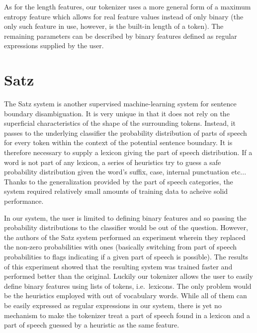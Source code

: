 As for the length features, our tokenizer uses a more general form of a maximum
entropy feature which allows for real feature values instead of only binary
(the only such feature in use, however, is the built-in length of a token).
The remaining parameters can be described by binary features defined as regular
expressions supplied by the user.

\section{Satz}
\label{sec:survey-satz}

The Satz system is another supervised machine-learning system for sentence
boundary disambiguation. It is very unique in that it does not rely on the
superficial characteristics of the shape of the surrounding tokens. Instead, it
passes to the underlying classifier the probability distribution of parts of
speech for every token within the context of the potential sentence boundary.
It is therefore necessary to supply a lexicon giving the part of speech
distribution. If a word is not part of any lexicon, a series of heuristics try
to guess a safe probability distribution given the word's suffix, case,
internal punctuation etc... Thanks to the generalization provided by the part
of speech categories, the system required relatively small amounts of training
data to acheive solid performance.

In our system, the user is limited to defining binary features and so passing
the probability distributions to the classifier would be out of the question.
However, the authors of the Satz system performed an experiment wherein they
replaced the non-zero probabilities with ones (basically switching from part of
speech probabilities to flags indicating if a given part of speech is
possible). The results of this experiment showed that the resulting system was
trained faster and performed better than the original. Luckily our tokenizer
allows the user to easily define binary features using lists of tokens, i.e.\
lexicons. The only problem would be the heuristics employed with out of
vocabulary words. While all of them can be easily expressed as regular
expressions in our system, there is yet no mechanism to make the tokenizer
treat a part of speech found in a lexicon and a part of speech guessed by a
heuristic as the same feature.

